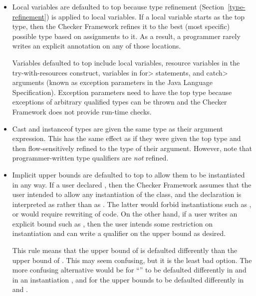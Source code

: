 \begin{itemize}
\item
Local variables are defaulted to top because type refinement
(Section~\ref{type-refinement}) is applied to local variables.  If a local
variable starts as the top type, then the Checker Framework refines it to
the best (most specific) possible type based on assignments to it.  As a
result, a programmer rarely writes an explicit annotation on any of those
locations.

Variables defaulted to top include local variables, resource variables in the
try-with-resources construct, variables in \<for> statements, and \<catch>
arguments (known as exception parameters in the Java Language Specification).
Exception parameters need to have the top type because
exceptions of arbitrary qualified types can be thrown and the Checker Framework
does not provide run-time checks.

\item
Cast and instanceof types
are given the same type as their argument expression.  This has the same
effect as if they were given the
top type and then flow-sensitively refined to the type of their argument.
However, note that programmer-written type qualifiers are \emph{not}
refined.

\item
Implicit upper bounds are defaulted to top to allow them to be instantiated
in any way.  If a user declared , then
the Checker Framework assumes that the user intended to allow any instantiation of the class,
and the declaration is interpreted as  rather than as .  The latter would forbid
instantiations such as , or would require
rewriting of code.  On the other hand, if a user writes an explicit bound
such as , then the user
intends some restriction on instantiation and can write a qualifier on the
upper bound as desired.

This rule means that the upper bound of  is defaulted
differently than the upper bound of .
This may seem confusing, but it is the least bad option.  The
more confusing alternative would be for ``'' to be defaulted
differently in  and in an
instantiation , and for the upper bounds to be defaulted
differently in 
and .


\end{itemize}
